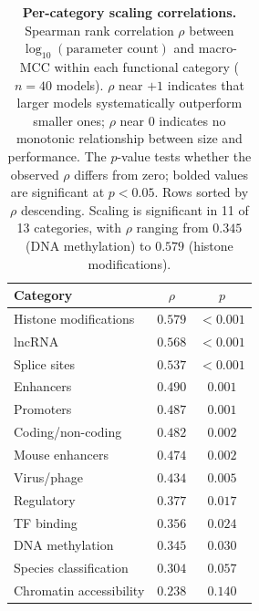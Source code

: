 \documentclass{article}
\theoremstyle{plain}
\theoremstyle{definition}
\theoremstyle{remark}
\begin{document}
\begin{table}[h]
\centering
\caption{\textbf{Per-category scaling correlations.} Spearman rank
correlation $\rho$ between $\log_{10}(\text{parameter count})$ and
macro-MCC within each functional category ($n=40$ models). $\rho$
near $+1$ indicates that larger models systematically outperform
smaller ones; $\rho$ near $0$ indicates no monotonic relationship
between size and performance. The $p$-value tests whether the
observed $\rho$ differs from zero; bolded values are significant at
$p<0.05$. Rows sorted by $\rho$ descending. Scaling is significant
in 11 of 13 categories, with $\rho$ ranging from $0.345$ (DNA
methylation) to $0.579$ (histone modifications).}
\label{tab:per_cat_scaling}
\small
\begin{tabular}{lcc}
\toprule
\textbf{Category} & \textbf{$\rho$} & \textbf{$p$} \\
\midrule
Histone modifications      & $\mathbf{0.579}$ & $<0.001$ \\
lncRNA                     & $\mathbf{0.568}$ & $<0.001$ \\
Splice sites               & $\mathbf{0.537}$ & $<0.001$ \\
Enhancers                  & $\mathbf{0.490}$ & $0.001$ \\
Promoters                  & $\mathbf{0.487}$ & $0.001$ \\
Coding/non-coding          & $\mathbf{0.482}$ & $0.002$ \\
Mouse enhancers            & $\mathbf{0.474}$ & $0.002$ \\
Virus/phage                & $\mathbf{0.434}$ & $0.005$ \\
Regulatory                 & $\mathbf{0.377}$ & $0.017$ \\
TF binding                 & $\mathbf{0.356}$ & $0.024$ \\
DNA methylation            & $\mathbf{0.345}$ & $0.030$ \\
Species classification     & $0.304$          & $0.057$ \\
Chromatin accessibility    & $0.238$          & $0.140$ \\
\bottomrule
\end{tabular}
\end{table}
\end{document}
